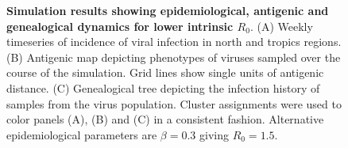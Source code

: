 \begin{figure}[!c]
	\centering
	\caption{\textbf{Simulation results showing epidemiological, antigenic and genealogical dynamics for lower intrinsic $R_0$}. (A) Weekly timeseries of incidence of viral infection in north and tropics regions. (B) Antigenic map depicting phenotypes of viruses sampled over the course of the simulation.  Grid lines show single units of antigenic distance. (C) Genealogical tree depicting the infection history of samples from the virus population.  Cluster assignments were used to color panels (A), (B) and (C) in a consistent fashion.  Alternative epidemiological parameters are $\beta = 0.3$ giving $R_0 = 1.5$.}
	\label{h1n1_r0}
\end{figure}

\pagebreak

